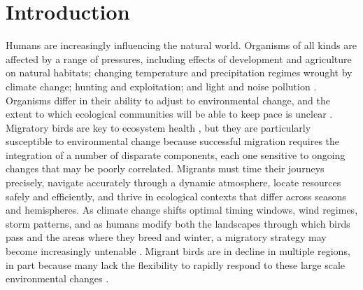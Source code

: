 \documentclass[a4paper, twoside]{templates/ociamthesis}
\begin{document}
\hypertarget{introduction-1}{%
\section{Introduction}\label{introduction-1}}

Humans are increasingly influencing the natural world. Organisms of all kinds are affected by a range of pressures, including effects of development and agriculture on natural habitats; changing temperature and precipitation regimes wrought by climate change; hunting and exploitation; and light and noise pollution \autocite{gastonEcologicalImpactsNighttime2013,hanskiHabitatLossDynamics2011,mantyka-pringleInteractionsClimateHabitat2012,benitez-lopezImpactHuntingTropical2017,kuncAquaticNoisePollution2016,urbanAcceleratingExtinctionRisk2015}. Organisms differ in their ability to adjust to environmental change, and the extent to which ecological communities will be able to keep pace is unclear \autocite{feeleyAmazonVulnerabilityClimate2012,liangHowDisturbanceCompetition2018,poloczanskaGlobalImprintClimate2013,urbanImprovingForecastBiodiversity2016}. Migratory birds are key to ecosystem health \autocite{bauerMigratoryAnimalsCouple2014}, but they are particularly susceptible to environmental change because successful migration requires the integration of a number of disparate components, each one sensitive to ongoing changes that may be poorly correlated. Migrants must time their journeys precisely, navigate accurately through a dynamic atmosphere, locate resources safely and efficiently, and thrive in ecological contexts that differ across seasons and hemispheres. As climate change shifts optimal timing windows, wind regimes, storm patterns, and as humans modify both the landscapes through which birds pass and the areas where they breed and winter, a migratory strategy may become increasingly untenable \autocite{wilcoveGoingGoingGone2008,rungeProtectedAreasGlobal2015}. Migrant birds are in decline in multiple regions, in part because many lack the flexibility to rapidly respond to these large scale environmental changes \autocite{beresfordPhenologyClimateChange,bothAvianPopulationConsequences2009,fraserIndividualVariabilityMigration2019,sandersonLongtermPopulationDeclines2006}.
\end{document}
